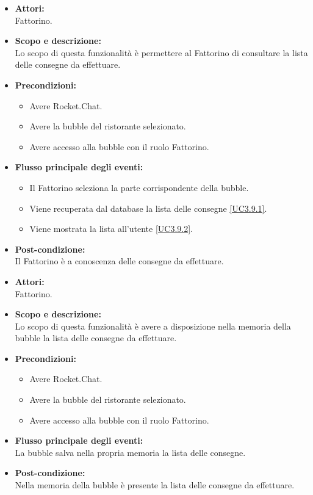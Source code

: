 \begin{itemize}
	\item \textbf{Attori:}
	\\Fattorino.
	\item \textbf{Scopo e descrizione:} 
	\\Lo scopo di questa funzionalità è permettere al Fattorino di consultare la lista delle consegne da effettuare.
	\item \textbf{Precondizioni:}
	\begin{itemize}
		\item Avere Rocket.Chat.
		\item Avere la bubble del ristorante selezionato.
		\item Avere accesso alla bubble con il ruolo Fattorino.
	\end{itemize}
	\item \textbf{Flusso principale degli eventi:}
	\begin{itemize}
		\item Il Fattorino seleziona la parte corrispondente della bubble.
		\item Viene recuperata dal database la lista delle consegne \ref{UC3.9.1}.
		\item Viene mostrata la lista all'utente \ref{UC3.9.2}.
	\end{itemize}
	\item \textbf{Post-condizione:}
	\\Il Fattorino è a conoscenza delle consegne da effettuare.
\end{itemize}


\begin{itemize}
	\item \textbf{Attori:}
	\\Fattorino.
	\item \textbf{Scopo e descrizione:} 
	\\Lo scopo di questa funzionalità è avere a disposizione nella memoria della bubble la lista delle consegne da effettuare.
	\item \textbf{Precondizioni:}
	\begin{itemize}
		\item Avere Rocket.Chat.
		\item Avere la bubble del ristorante selezionato.
		\item Avere accesso alla bubble con il ruolo Fattorino.
	\end{itemize}
	\item \textbf{Flusso principale degli eventi:}
	\\La bubble salva nella propria memoria la lista delle consegne.
	\item \textbf{Post-condizione:}
	\\Nella memoria della bubble è presente la lista delle consegne da effettuare.
\end{itemize}

